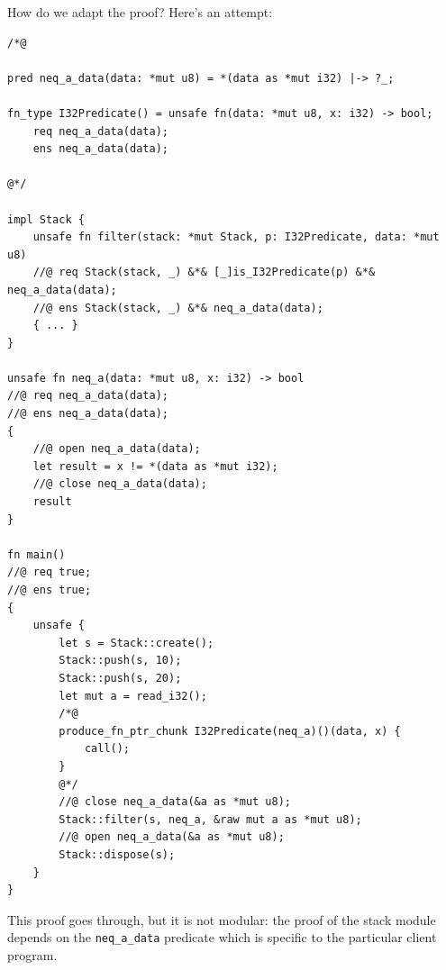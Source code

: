 \documentclass{article}
\begin{document}
How do we adapt the proof? Here's an attempt:
\begin{lstlisting}
/*@

pred neq_a_data(data: *mut u8) = *(data as *mut i32) |-> ?_;

fn_type I32Predicate() = unsafe fn(data: *mut u8, x: i32) -> bool;
    req neq_a_data(data);
    ens neq_a_data(data);

@*/

impl Stack {
    unsafe fn filter(stack: *mut Stack, p: I32Predicate, data: *mut u8)
    //@ req Stack(stack, _) &*& [_]is_I32Predicate(p) &*& neq_a_data(data);
    //@ ens Stack(stack, _) &*& neq_a_data(data);
    { ... }
}

unsafe fn neq_a(data: *mut u8, x: i32) -> bool
//@ req neq_a_data(data);
//@ ens neq_a_data(data);
{
    //@ open neq_a_data(data);
    let result = x != *(data as *mut i32);
    //@ close neq_a_data(data);
    result
}

fn main()
//@ req true;
//@ ens true;
{
    unsafe {
        let s = Stack::create();
        Stack::push(s, 10);
        Stack::push(s, 20);
        let mut a = read_i32();
        /*@
        produce_fn_ptr_chunk I32Predicate(neq_a)()(data, x) {
            call();
        }
        @*/
        //@ close neq_a_data(&a as *mut u8);
        Stack::filter(s, neq_a, &raw mut a as *mut u8);
        //@ open neq_a_data(&a as *mut u8);
        Stack::dispose(s);
    }
}
\end{lstlisting}

This proof goes through, but it is not modular: the proof of the stack module depends on the \lstinline|neq_a_data|
predicate which is specific to the particular client program.
\end{document}
